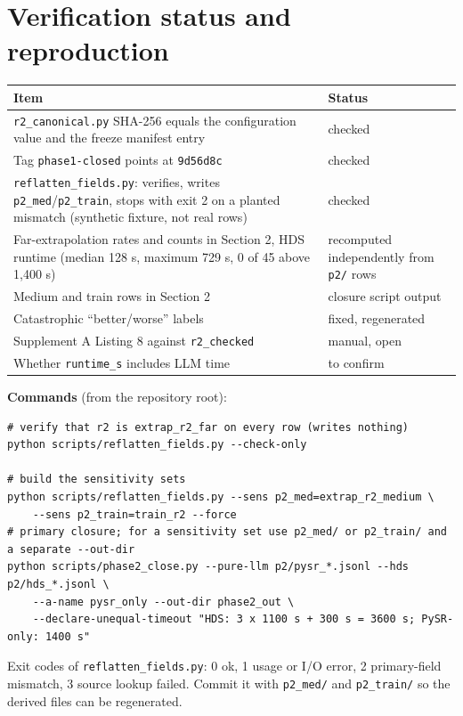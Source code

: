 \documentclass[11pt,a4paper]{article}
\newcommand{\code}[1]{\texttt{#1}}
\begin{document}
\section{Verification status and reproduction}
\begin{table}[ht]
\centering\small
\begin{tabularx}{\textwidth}{@{}X l@{}}
\toprule
Item & Status \\
\midrule
\code{r2\_canonical.py} SHA-256 equals the configuration value and the freeze manifest entry & checked \\
Tag \code{phase1-closed} points at \code{9d56d8c} & checked \\
\code{reflatten\_fields.py}: verifies, writes \code{p2\_med}/\code{p2\_train}, stops with exit 2 on a planted mismatch (synthetic fixture, not real rows) & checked \\
Far-extrapolation rates and counts in Section 2, HDS runtime (median 128 s, maximum 729 s, 0 of 45 above 1,400 s) & recomputed independently from \code{p2/} rows \\
Medium and train rows in Section 2 & closure script output \\
Catastrophic ``better/worse'' labels & fixed, regenerated \\
Supplement A Listing 8 against \code{r2\_checked} & manual, open \\
Whether \code{runtime\_s} includes LLM time & to confirm \\
\bottomrule
\end{tabularx}
\end{table}

\textbf{Commands} (from the repository root):
\begin{verbatim}
# verify that r2 is extrap_r2_far on every row (writes nothing)
python scripts/reflatten_fields.py --check-only

# build the sensitivity sets
python scripts/reflatten_fields.py --sens p2_med=extrap_r2_medium \
    --sens p2_train=train_r2 --force
# primary closure; for a sensitivity set use p2_med/ or p2_train/ and a separate --out-dir
python scripts/phase2_close.py --pure-llm p2/pysr_*.jsonl --hds p2/hds_*.jsonl \
    --a-name pysr_only --out-dir phase2_out \
    --declare-unequal-timeout "HDS: 3 x 1100 s + 300 s = 3600 s; PySR-only: 1400 s"
\end{verbatim}
Exit codes of \code{reflatten\_fields.py}: 0 ok, 1 usage or I/O error, 2 primary-field mismatch, 3 source lookup failed. Commit it with \code{p2\_med/} and \code{p2\_train/} so the derived files can be regenerated.
\end{document}
